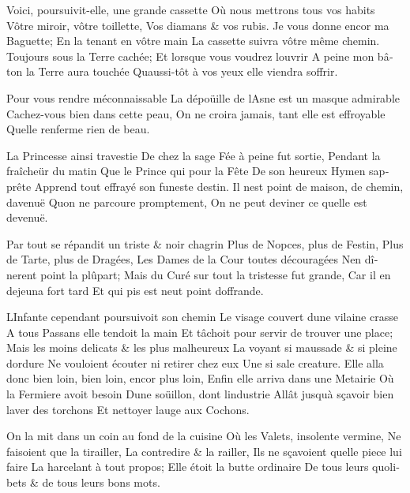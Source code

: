 \documentclass[14pt,a4paper]{memoir}
\begin{document}
\begin{otherlanguage}{french}
{Voici, poursuivit-elle, une grande cassette} {Où nous mettrons tous vos
habits} {Vôtre miroir, vôtre toillette,} {Vos diamans \& vos rubis.} {Je
vous donne encor ma Baguette;} {En la tenant en vôtre main} {La cassette
suivra vôtre même chemin.} {Toujours sous la Terre cachée;} {Et lorsque
vous voudrez l\textquotesingle ouvrir} {A peine mon bâton la Terre aura
touchée} {Qu\textquotesingle aussi-tôt à vos yeux elle viendra
s\textquotesingle offrir.}

{Pour vous rendre méconnaissable} {La dépoüille de
l\textquotesingle Asne est un masque admirable} {Cachez-vous bien dans
cette peau,} {On ne croira jamais, tant elle est effroyable}
{Qu\textquotesingle elle renferme rien de beau.}

{La Princesse ainsi travestie} {De chez la sage Fée à peine fut sortie,}
{Pendant la fraîcheür du matin} {Que le Prince qui pour la Fête} {De son
heureux Hymen s\textquotesingle apprête} {Apprend tout effrayé son
funeste destin.} {Il n\textquotesingle est point de maison, de chemin,
d\textquotesingle avenuë} {Qu\textquotesingle on ne parcoure
promptement,} {On ne peut deviner ce qu\textquotesingle elle est
devenuë.}

{Par tout se répandit un triste \& noir chagrin } {Plus de Nopces, plus
de Festin,} {Plus de Tarte, plus de Dragées,} {Les Dames de la Cour
toutes découragées} {N\textquotesingle en dînerent point la plûpart;}
{Mais du Curé sur tout la tristesse fut grande,} {Car il en dejeuna fort
tard} {Et qui pis est n\textquotesingle eut point
d\textquotesingle offrande.}

{L\textquotesingle Infante cependant poursuivoit son chemin} {Le visage
couvert d\textquotesingle une vilaine crasse} {A tous Passans elle
tendoit la main} {Et tâchoit pour servir de trouver une place;} {Mais
les moins delicats \& les plus malheureux } {La voyant si maussade \& si
pleine d\textquotesingle ordure} {Ne vouloient écouter ni retirer chez
eux} {Une si sale creature.} {Elle alla donc bien loin, bien loin, encor
plus loin,} {Enfin elle arriva dans une Metairie} {Où la Fermiere avoit
besoin} {D\textquotesingle une soüillon, dont
l\textquotesingle industrie} {Allât jusqu\textquotesingle à sçavoir bien
laver des torchons} {Et nettoyer l\textquotesingle auge aux Cochons.}

{On la mit dans un coin au fond de la cuisine} {Où les Valets, insolente
vermine,} {Ne faisoient que la tirailler,} {La contredire \& la
railler,} {Ils ne sçavoient quelle piece lui faire} {La harcelant à tout
propos;} {Elle étoit la butte ordinaire} {De tous leurs quolibets \& de
tous leurs bons mots.}


\end{otherlanguage}
\end{document}
